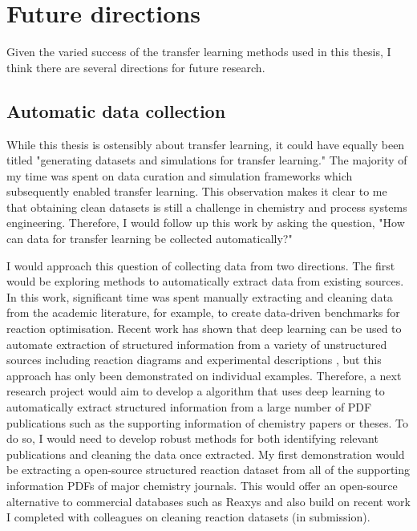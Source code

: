\section{Future directions}

Given the varied success of the transfer learning methods used in this thesis, I think there are several directions for future research.



\subsection{Automatic data collection}

While this thesis is ostensibly about transfer learning, it could have equally been titled "generating datasets and simulations for transfer learning." The majority of my time was spent on data curation and simulation frameworks which subsequently enabled transfer learning.  This observation makes it clear to me that obtaining clean datasets is still a challenge in chemistry and process systems engineering. Therefore, I would follow up this work by asking the question, "How can data for transfer learning be collected automatically?"

I would approach this question of collecting data from two directions. The first would be exploring methods to automatically extract data from existing sources. In this work, significant time was spent manually extracting and cleaning data from the academic literature, for example, to create data-driven benchmarks for reaction optimisation. Recent work has shown that deep learning can be used to automate extraction of structured information from a variety of unstructured sources including reaction diagrams\cite{Qian2023} and experimental descriptions \cite{Guo2021}, but this approach has only been demonstrated on individual examples. Therefore, a next research project would aim to develop a algorithm that uses deep learning to  automatically extract structured information from a large number of PDF publications such as the supporting information of chemistry papers or theses. To do so, I would need to develop robust methods for both identifying relevant publications and cleaning the data once extracted.  My first demonstration would be extracting a open-source structured reaction dataset from all of the supporting information PDFs of major chemistry journals. This would offer an open-source alternative to commercial databases such as Reaxys and also build on recent work I completed with colleagues on cleaning reaction datasets (in submission).

